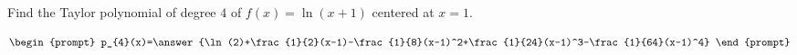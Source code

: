 \documentclass{ximera}
\author{Gregory Hartman \and Matthew Carr}
\begin{document}
\begin{exercise}




Find the Taylor polynomial of degree $4$ of $f(x)=\ln(x+1)$ centered at $x=1$.

\[
\begin{prompt}
p_{4}(x)=\answer{\ln(2)+\frac{1}{2}(x-1)-\frac{1}{8}(x-1)^2+\frac{1}{24}(x-1)^3-\frac{1}{64}(x-1)^4}
\end{prompt}
\]

\end{exercise}
\end{document}
